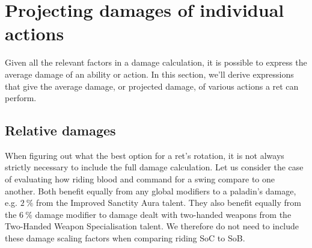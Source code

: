 
\section{Projecting damages of individual actions}
Given all the relevant factors in a damage calculation, it is possible to express the average damage of an ability or action.
In this section, we'll derive expressions that give the average damage, or projected damage, of various actions a ret can perform.

\subsection{Relative damages}
When figuring out what the best option for a ret's rotation, it is not always strictly necessary to include the full damage calculation.
Let us consider the case of evaluating how riding blood and command for a swing compare to one another.
Both benefit equally from any global modifiers to a paladin's damage, e.g. $2~\%$ from the Improved Sanctity Aura talent.
They also benefit equally from the $6~\%$ damage modifier to damage dealt with two-handed weapons from the Two-Handed Weapon Specialisation talent.
We therefore do not need to include these damage scaling factors when comparing riding SoC to SoB.

